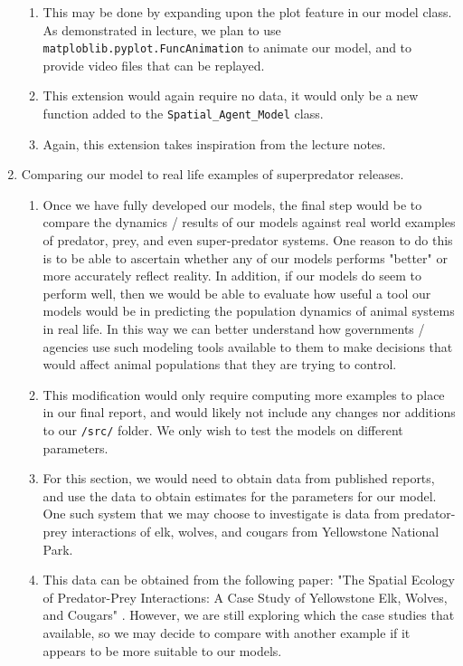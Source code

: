 \documentclass{article}
\begin{document}
\begin{enumerate}
\begin{enumerate}
        \item This may be done by expanding upon the plot feature in our model class. As demonstrated in lecture, we plan to use \verb|matploblib.pyplot.FuncAnimation| to animate our model, and to provide video files that can be replayed. \cite{Goodwill}
        \item This extension would again require no data, it would only be a new function added to the \verb|Spatial_Agent_Model| class.
        \item Again, this extension takes inspiration from the lecture notes. \cite{Goodwill}
    \end{enumerate}
    \item Comparing our model to real life examples of superpredator releases.\begin{enumerate}
        \item Once we have fully developed our models, the final step would be to compare the dynamics / results of our models against real world examples of predator, prey, and even super-predator systems. One reason to do this is to be able to ascertain whether any of our models performs "better" or more accurately reflect reality. In addition, if our models do seem to perform well, then we would be able to evaluate how useful a tool our models would be in predicting the population dynamics of animal systems in real life. In this way we can better understand how governments / agencies use such modeling tools available to them to make decisions that would affect animal populations that they are trying to control.
        \item This modification would only require computing more examples to place in our final report, and would likely not include any changes nor additions to our \verb|/src/| folder. We only wish to test the models on different parameters.
        \item For this section, we would need to obtain data from published reports, and use the data to obtain estimates for the parameters for our model. One such system that we may choose to investigate is data from predator-prey interactions of elk, wolves, and cougars from Yellowstone National Park.
        \item This data can be obtained from the following paper: "The Spatial Ecology of Predator-Prey Interactions: A Case Study of Yellowstone Elk, Wolves, and Cougars" \cite{USU}.
        However, we are still exploring which the case studies that available, so we may decide to compare with another example if it appears to be more suitable to our models.
    \end{enumerate}
\end{enumerate}

\newpage



\end{document}
